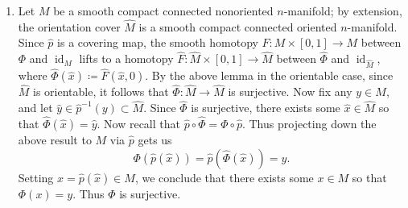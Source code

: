 \documentclass{article}
\begin{document}
\begin{enumerate}[itemsep =-2pt,label = (\arabic{*})]
		\item Let $M$ be a smooth compact connected nonoriented $n$-manifold; by extension, the orientation cover $\hat{M}$ is a smooth compact connected oriented $n$-manifold. Since $\hat{p}$ is a covering map, the smooth homotopy $F: M \times [0,1] \to M$ between $\Phi$ and $\operatorname{id}_{M}$ lifts to a homotopy $\hat{F}: \hat{M} \times [0,1] \to \hat{M}$ between $\hat{\Phi}$ and $\operatorname{id}_{\hat{M}}$, where $\hat{\Phi}(\hat{x}) \coloneqq \hat{F}(\hat{x}, 0)$. By the above lemma in the orientable case, since $\hat{M}$ is orientable, it follows that $\hat{\Phi}: \hat{M} \to \hat{M}$ is surjective. Now fix any $y \in M$, and let $\hat{y} \in \hat{p}^{-1}(y) \subset \hat{M}$. Since $\hat{\Phi}$ is surjective, there exists some $\hat{x} \in \hat{M}$ so that $\hat{\Phi}(\hat{x}) = \hat{y}$. Now recall that $\hat{p} \circ \hat{\Phi} = \Phi \circ \hat{p}$. Thus projecting down the above result to $M$ via $\hat{p}$ gets us 
		\begin{equation*}
			\Phi(\hat{p}(\hat{x})) = \hat{p}(\hat{\Phi}(\hat{x})) = y. 
		\end{equation*}
		Setting $x = \hat{p}(\hat{x}) \in M$, we conclude that there exists some $x \in M$ so that $\Phi(x) = y$. Thus $\Phi$ is surjective. 
	\end{enumerate}
	
\end{document}
